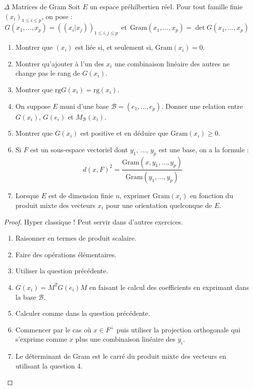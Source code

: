 \documentclass[french,a4paper]{article}
\theoremstyle{plain}
\theoremstyle{definition}
\theoremstyle{remark}
\begin{document}
\begin{ex}{$\Delta$ Matrices de Gram}
	Soit $E$ un espace préhilbertien réel. Pour tout famille finie $(x_i)_{1\leqslant i\leqslant p}$, on pose : $$G(x_1,\ldots,x_p)=((x_i|x_j))_{1\leqslant i,j\leqslant p}\ \ \text{et} \ \ \text{Gram}(x_1,\ldots,x_p)=\det G(x_1,\ldots,x_p)$$
	\begin{enumerate}
		\item Montrer que $(x_i)$ est liée si, et seulement si, $\text{Gram}(x_i)=0$.
		\item Montrer qu'ajouter à l'un des $x_i$ une combinaison linéaire des autres ne change pas le rang de $G(x_i)$.
		\item Montrer que $\text{rg}G(x_i)=\text{rg}(x_i)$.
		\item On suppose $E$ muni d'une base $\mathcal{B}=(e_1,\ldots,e_p)$. Donner une relation entre $G(x_i)$, $G(e_i)$ et $M_\mathcal{B}(x_i)$.
		\item Montrer que $G(x_i)$ est positive et en déduire que $\text{Gram}(x_i)\geqslant0$.
		\item Si $F$ est un sous-espace vectoriel dont $y_1$, ..., $y_p$ est une base, on a la formule : $$d(x,F)^2=\frac{\text{Gram}(x,y_1,\ldots,y_p)}{\text{Gram}(y_1,\ldots,y_p)}$$
		\item Lorsque $E$ est de dimension finie $n$, exprimer $\text{Gram}(x_i)$ en fonction du produit mixte des vecteurs $x_i$ pour une orientation quelconque de $E$.
	\end{enumerate}
\end{ex}
\begin{proof}
	Hyper classique ! Peut servir dans d'autres exercices.
	\begin{enumerate}
		\item Raisonner en termes de produit scalaire.
		\item Faire des opérations élémentaires.
		\item Utiliser la question précédente.
		\item $G(x_i)=M^TG(e_i)M$ en faisant le calcul des coefficients en exprimant dans la base $\mathcal{B}$.
		\item Calculer comme dans la question précédente.
		\item Commencer par le cas où $x\in F^\bot$ puis utiliser la projection orthogonale qui s'exprime comme $x$ plus une combinaison linéaire des $y_i$.
		\item Le déterminant de Gram est le carré du produit mixte des vecteurs en utilisant la question 4.
	\end{enumerate}
\end{proof}
\end{document}
